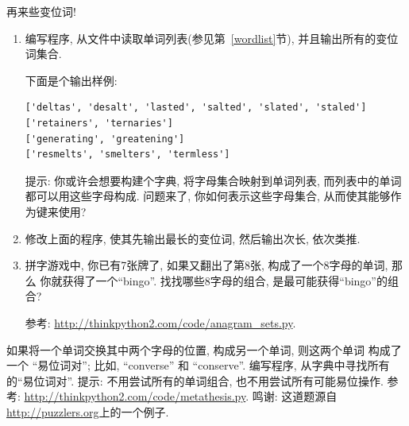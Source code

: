 \documentclass[10pt]{book}
\begin{document}
\begin{exercise}
\label{anagrams}

再来些变位词!

\begin{enumerate}

\item 编写程序, 从文件中读取单词列表(参见第~\ref{wordlist}节), 
并且输出所有的变位词集合. 

下面是个输出样例:

\begin{verbatim}
['deltas', 'desalt', 'lasted', 'salted', 'slated', 'staled']
['retainers', 'ternaries']
['generating', 'greatening']
['resmelts', 'smelters', 'termless']
\end{verbatim}
%
提示: 你或许会想要构建个字典, 将字母集合映射到单词列表, 
而列表中的单词都可以用这些字母构成. 问题来了, 你如何表示这些字母集合, 
从而使其能够作为键来使用?

\item 修改上面的程序, 使其先输出最长的变位词, 然后输出次长, 依次类推. 

\item 拼字游戏中, 你已有7张牌了, 如果又翻出了第8张, 构成了一个8字母的单词, 那么
你就获得了一个``bingo''. 找找哪些8字母的组合, 是最可能获得``bingo''的组合?


参考: \url{http://thinkpython2.com/code/anagram_sets.py}.

\end{enumerate}
\end{exercise}

\begin{exercise}
如果将一个单词交换其中两个字母的位置, 构成另一个单词, 则这两个单词
构成了一个 ``易位词对''; 比如, ``converse'' 和 ``conserve''.  
编写程序, 从字典中寻找所有的``易位词对''.
提示: 不用尝试所有的单词组合, 也不用尝试所有可能易位操作. 
参考:
\url{http://thinkpython2.com/code/metathesis.py}.  
鸣谢: 这道题源自\url{http://puzzlers.org}上的一个例子. 
\end{exercise}
\end{document}
